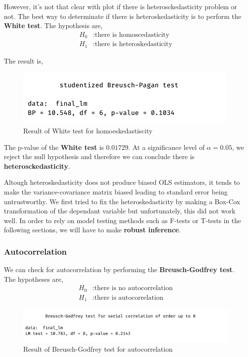 However, it's not that clear with plot if there is heterosckedasticity problem or not. The best way to determinate if there is heteroskedasticity is to perform the \textbf{White test}. The hypothesis are,
\begin{align*}
	H_0&: \text{there is homoscedasticity} \\
	H_1&: \text{there is heteroskedasticity}
\end{align*}

The result is,
\begin{figure}[H]
	\centering
	\includegraphics{figures/models/white_test.png}
	\caption{Result of White test for homoeskedastiscity}
	\label{fig:white_test}
\end{figure}

The p-value of the \textbf{White test} is $0.01729$. At a significance level of $\alpha = 0.05$, we reject the null hypothesis and therefore we can conclude there is \textbf{heterosckedasticity}.

Altough heteroskedasticity does not produce biased OLS estimators, it tends to make the variance-covariance matrix biased leading to standard error being untrustworthy.
We first tried to fix the heteroskedasticity by making a Box-Cox transformation of the dependant variable but unfortunately, this did not work well. In order to rely on model testing methods such as F-tests or T-tests in the following sections, we will have to make \textbf{robust inference}.

\subsubsection{Autocorrelation}

We can check for autocorrelation by performing the \textbf{Breusch-Godfrey test}. The hypotheses are,
\begin{align*}
	H_0&: \text{there is no autocorrelation} \\
	H_1&: \text{there is autocorrelation}
\end{align*}

\begin{figure}[H]
	\centering
	\includegraphics{figures/models/Breusch-Godfrey_test.png}
	\caption{Result of Breusch-Godfrey test for autocorrelation}
	\label{fig:breusch-godfrey-test}
\end{figure}


